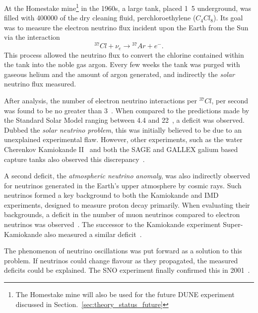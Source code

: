At the Homestake mine\footnote{The Homestake mine will also be used for the future DUNE experiment
    discussed in Section.~\ref{sec:theory_status_future}} in the 1960s, a large tank, placed
\unit{1.5}{} underground, was filled with \unit{400000}{\litre} of the dry cleaning
fluid, perchloroethylene ($C_{4}Cl_{8}$). Its goal was to measure the electron neutrino flux
incident upon the Earth from the Sun via the interaction
\begin{equation} %
    {}^{37}Cl+\nu_{e}\rightarrow{}^{37}Ar+e^{-}.
\end{equation} %
This process allowed the neutrino flux to convert the chlorine contained within the tank into the
noble gas argon. Every few weeks the tank was purged with gaseous helium and the amount of argon
generated, and indirectly the \emph{solar} neutrino flux measured.

After analysis, the number of electron neutrino interactions per ${}^{37}Cl$, per second was found
to be no greater than 3~\cite{davis1968}. When compared to the predictions made by the Standard
Solar Model ranging between 4.4 and 22~\cite{bahcall1968}, a deficit was observed. Dubbed the
\emph{solar neutrino problem}, this was initially believed to be due to an unexplained
experimental flaw. However, other experiments, such as the water Cherenkov Kamiokande
II~\cite{hirata1989} and both the SAGE and GALLEX galium based capture tanks also observed this
discrepancy~\cite{abazov1991,anselmann1994}.

A second deficit, the \emph{atmospheric neutrino anomaly}, was also indirectly observed for
neutrinos generated in the Earth's upper atmosphere by cosmic rays. Such neutrinos formed a key
background to both the Kamiokande and IMD experiments, designed to measure proton decay primarily.
When evaluating their backgrounds, a deficit in the number of muon neutrinos compared to electron
neutrinos was observed~\cite{hirata1988, becker1992}. The successor to the Kamiokande experiment
Super-Kamiokande also measured a similar deficit~\cite{kajita1999}.

The phenomenon of neutrino oscillations was put forward as a solution to this problem. If
neutrinos could change flavour as they propagated, the measured deficits could be explained. The
SNO experiment finally confirmed this in 2001~\cite{ahmad2002}.

